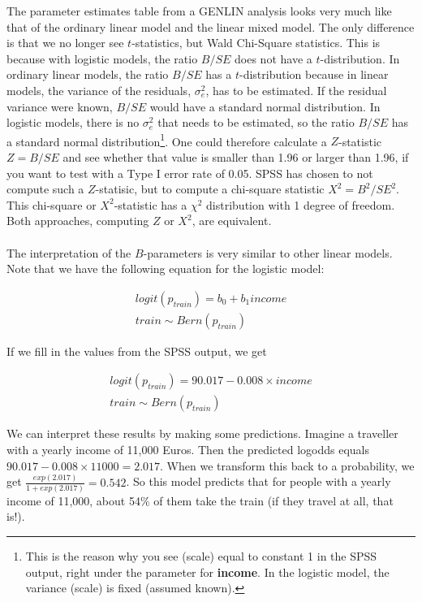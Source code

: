 \documentclass[]{book}\usepackage[]{graphicx}\usepackage[]{color}
\begin{document}
The parameter estimates table from a GENLIN analysis looks very much like that of the ordinary linear model and the linear mixed model. The only difference is that we no longer see $t$-statistics, but Wald Chi-Square statistics. This is because with logistic models, the ratio $B/SE$ does not have a $t$-distribution. In ordinary linear models, the ratio $B/SE$ has a $t$-distribution because in linear models, the variance of the residuals, $\sigma^2_e$, has to be estimated. If the residual variance were known, $B/SE$ would have a standard normal distribution. In logistic models, there is no $\sigma^2_e$ that needs to be estimated, so the ratio $B/SE$ has a standard normal distribution\footnote{This is the reason why you see (scale) equal to constant 1 in the SPSS output, right under the parameter for \textbf{income}. In the logistic model, the variance (scale) is fixed (assumed known).}. One could therefore calculate a $Z$-statistic $Z=B/SE$ and see whether that value is smaller than 1.96 or larger than 1.96, if you want to test with a Type I error rate of 0.05. SPSS has chosen to not compute such a $Z$-statisic, but to compute a chi-square statistic $X^2= B^2/SE^2$. This chi-square or $X^2$-statistic has a $\chi^2$ distribution with 1 degree of freedom. Both approaches, computing $Z$ or $X^2$, are equivalent.
\\
\\
The interpretation of the $B$-parameters is very similar to other linear models. Note that we have the following equation for the logistic model:



\begin{eqnarray}
logit(p_{train}) = b_0 + b_1 income \nonumber \\
train \sim Bern(p_{train})
\end{eqnarray}

If we fill in the values from the SPSS output, we get


\begin{eqnarray}
logit(p_{train}) = 90.017 - 0.008 \times income \nonumber \\
train \sim Bern(p_{train})
\end{eqnarray}


We can interpret these results by making some predictions. Imagine a traveller with a yearly income of 11,000 Euros. Then the predicted logodds equals $90.017 - 0.008 \times 11000= 2.017$. When we transform this back to a probability, we get $\frac{exp(2.017) } {1+ exp(2.017) }= 0.542  $. So this model predicts that for people with a yearly income of 11,000, about 54\% of them take the train (if they travel at all, that is!).
\end{document}
